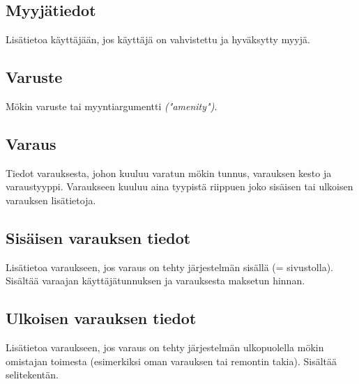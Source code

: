 \subsection{Myyjätiedot}
Lisätietoa käyttäjään, jos käyttäjä on vahvistettu ja hyväksytty myyjä.

\subsection{Varuste}
Mökin varuste tai myyntiargumentti \textit{("amenity")}.

\subsection{Varaus}
Tiedot varauksesta, johon kuuluu varatun mökin tunnus, varauksen kesto ja varaustyyppi. Varaukseen kuuluu aina tyypistä riippuen joko sisäisen tai ulkoisen varauksen lisätietoja.

\subsection{Sisäisen varauksen tiedot}
Lisätietoa varaukseen, jos varaus on tehty järjestelmän sisällä (= sivustolla). Sisältää varaajan käyttäjätunnuksen ja varauksesta maksetun hinnan.

\subsection{Ulkoisen varauksen tiedot}
Lisätietoa varaukseen, jos varaus on tehty järjestelmän ulkopuolella mökin omistajan toimesta (esimerkiksi oman varauksen tai remontin takia). Sisältää selitekentän.